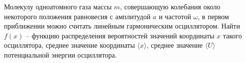 \begin{ex}
Молекулу одноатомного газа массы $m$, совершающую колебания около некоторого положения равновесия с амплитудой $a$ и частотой $\omega$, 
в первом приближении можно считать линейным гармоническим осциллятором. 
Найти $f(x)$ -- функцию распределения вероятностей значений координаты $x$ такого осциллятора, среднее значение координаты $\langle x \rangle$, 
среднее значение $\langle U \rangle$ потенциальной энергии осциллятора.
\begin{ans}
\end{ans}
\end{ex}